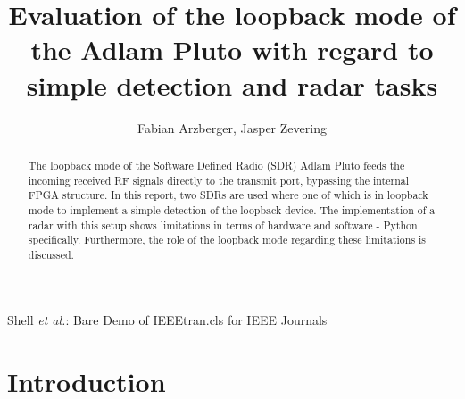 \documentclass[journal]{IEEEtran}
\begin{document}
\title{Evaluation of the loopback mode of the Adlam Pluto with regard to simple detection and radar tasks }


\author{Fabian Arzberger,
        Jasper Zevering}


%
{Shell \MakeLowercase{\textit{et al.}}: Bare Demo of IEEEtran.cls for IEEE Journals}





\maketitle

\begin{abstract}
The loopback mode of the Software Defined Radio (SDR) Adlam Pluto feeds the incoming received RF signals directly to the transmit port, bypassing the internal FPGA structure.
In this report, two SDRs are used where one of which is in loopback mode to implement a simple detection of the loopback device.
The implementation of a radar with this setup shows limitations in terms of hardware and software - Python specifically.
Furthermore, the role of the loopback mode regarding these limitations is discussed.
\end{abstract}



\IEEEpeerreviewmaketitle


\section{Introduction}
\label{sec:introduction}
\end{document}
